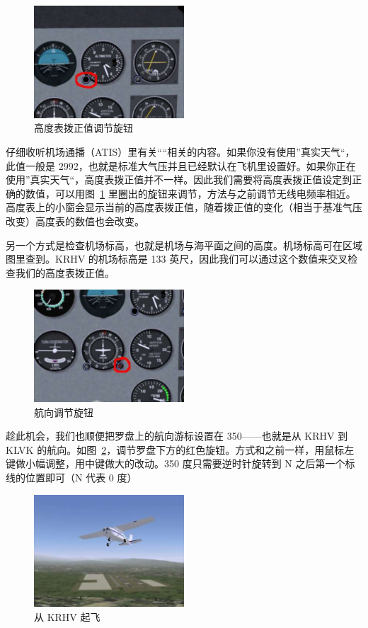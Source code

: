 \begin{figure}[!htp]
\centering
\includegraphics[width=0.5\textwidth]{altimeter}
\caption{高度表拨正值调节旋钮\label{altimeter}}
\end{figure}

仔细收听机场通播（ATIS）里有关““相关的内容。如果你没有使用”真实天气“，此值一般是 2992，也就是标准大气压并且已经默认在飞机里设置好。如果你正在使用”真实天气“，高度表拨正值并不一样。因此我们需要将高度表拨正值设定到正确的数值，可以用图~\ref{altimeter} 里圈出的旋钮来调节，方法与之前调节无线电频率相近。高度表上的小窗会显示当前的高度表拨正值，随着拨正值的变化（相当于基准气压改变）高度表的数值也会改变。

另一个方式是检查机场标高，也就是机场与海平面之间的高度。机场标高可在区域图里查到。KRHV 的机场标高是 133 英尺，因此我们可以通过这个数值来交叉检查我们的高度表拨正值。

\begin{figure}[!htp]
\centering
\includegraphics[width=0.5\textwidth]{compass}
\caption{航向调节旋钮\label{head}}
\end{figure}

趁此机会，我们也顺便把罗盘上的航向游标设置在 350——也就是从 KRHV 到 KLVK 的航向。如图~\ref{head}，调节罗盘下方的红色旋钮。方式和之前一样，用鼠标左键做小幅调整，用中键做大的改动。350 度只需要逆时针旋转到 N 之后第一个标线的位置即可（N 代表 0 度）

\begin{figure}[!htp]
\centering
\includegraphics[width=0.5\textwidth]{takeoff}
\caption{从 KRHV 起飞}
\end{figure}

